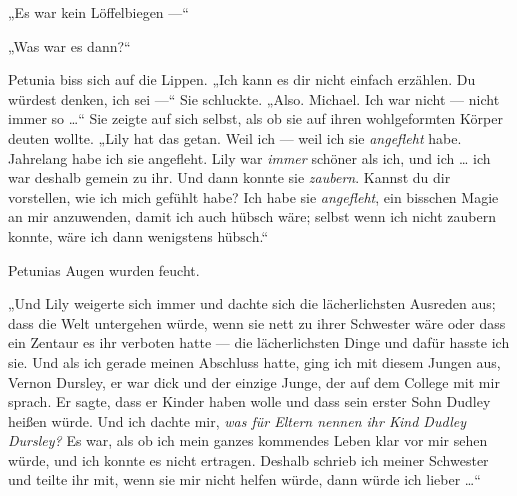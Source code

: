 „Es war kein Löffelbiegen —“

„Was war es dann?“

Petunia biss sich auf die Lippen.
„Ich kann es dir nicht einfach erzählen. Du würdest denken, ich sei —“ Sie schluckte.
„Also. Michael. Ich war nicht — nicht immer so …“ Sie zeigte auf sich selbst, als ob sie auf ihren wohlgeformten Körper deuten wollte.
„Lily hat das getan. Weil ich — weil ich sie \emph{angefleht} habe. Jahrelang habe ich sie angefleht. Lily war \emph{immer} schöner als ich, und ich … ich war deshalb gemein zu ihr. Und dann konnte sie \emph{zaubern}. Kannst du dir vorstellen, wie ich mich gefühlt habe? Ich habe sie \emph{angefleht}, ein bisschen Magie an mir anzuwenden, damit ich auch hübsch wäre; selbst wenn ich nicht zaubern konnte, wäre ich dann wenigstens hübsch.“

Petunias Augen wurden feucht.

„Und Lily weigerte sich immer und dachte sich die lächerlichsten Ausreden aus; dass die Welt untergehen würde, wenn sie nett zu ihrer Schwester wäre oder dass ein Zentaur es ihr verboten hatte — die lächerlichsten Dinge und dafür hasste ich sie. Und als ich gerade meinen Abschluss hatte, ging ich mit diesem Jungen aus, Vernon Dursley, er war dick und der einzige Junge, der auf dem College mit mir sprach. Er sagte, dass er Kinder haben wolle und dass sein erster Sohn Dudley heißen würde. Und ich dachte mir, \emph{was für Eltern nennen ihr Kind Dudley Dursley?} Es war, als ob ich mein ganzes kommendes Leben klar vor mir sehen würde, und ich konnte es nicht ertragen. Deshalb schrieb ich meiner Schwester und teilte ihr mit, wenn sie mir nicht helfen würde, dann würde ich lieber …“

